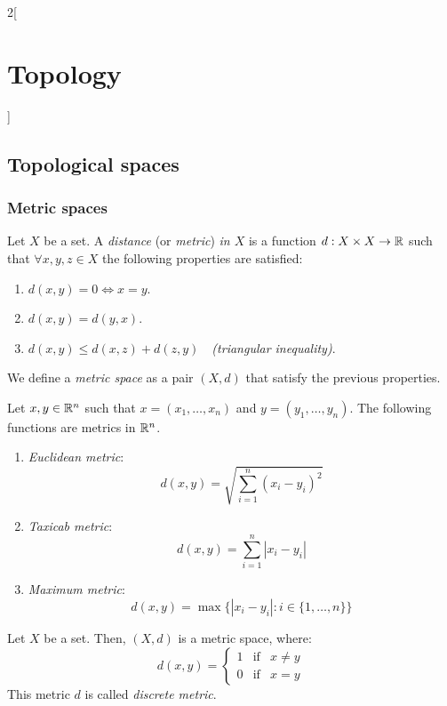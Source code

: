 \documentclass[../../../main.tex]{subfiles}
\begin{document}
\begin{multicols}{2}[\section{Topology}]
  \subsection{Topological spaces}
  \subsubsection{Metric spaces}
  \begin{definition}
    Let $X$ be a set. A \textit{distance} (or \textit{metric}) \textit{in $X$} is a function $d:X\times X\rightarrow\mathbb{R} $ such that $\forall x,y,z\in X$ the following properties are satisfied:
    \begin{enumerate}
      \item $d(x,y)=0\iff x=y$.
      \item $d(x,y)=d(y,x)$.
      \item $d(x,y)\leq d(x,z)+d(z,y)\quad$\textit{(triangular inequality)}.
    \end{enumerate}
    We define a \textit{metric space} as a pair $(X,d)$ that satisfy the previous properties.
  \end{definition}
  \begin{prop}
    Let $x,y\in\mathbb{R}^n$ such that $x=(x_1,\ldots,x_n)$ and $y=(y_1,\ldots,y_n)$. The following functions are metrics in $\mathbb{R}^n$.
    \begin{enumerate}
      \item \textit{Euclidean metric}: $$d(x,y)=\sqrt{\sum_{i=1}^n{(x_i-y_i)}^2}$$
      \item \textit{Taxicab metric}: $$d(x,y)=\sum_{i=1}^n|x_i-y_i|$$
      \item \textit{Maximum metric}: $$d(x,y)=\max\{|x_i-y_i|:i\in\{1,\ldots,n\}\}$$
    \end{enumerate}
  \end{prop}
  \begin{prop}
    Let $X$ be a set. Then, $(X,d)$ is a metric space, where: $$d(x,y)=
      \left\{\begin{array}{lcc}
        1 & \text{if} & x\ne y \\
        0 & \text{if} & x= y
      \end{array}\right.
    $$
    This metric $d$ is called \textit{discrete metric}.
  \end{prop}

\end{multicols}
\end{document}
